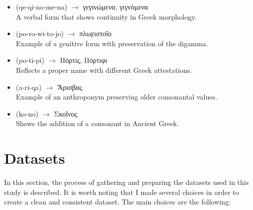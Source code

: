 \begin{itemize}
    \item \textlinb{\Bqe\Bqi\Bno\Bme\Bna} (qe-qi-no-me-na) $\rightarrow$ \textgreek{γεγινώμενα}, \textgreek{γιγνόμενα} \\  
    A verbal form that shows continuity in Greek morphology.

    \item \textlinb{\Bpo\Bro\Bwi\Bto\Bjo} (po-ro-wi-to-jo) $\rightarrow$ \textgreek{πλωϝιστοῖο} \\  
    Example of a genitive form with preservation of the digamma.

    \item \textlinb{\Bpo\Bti\Bpi} (po-ti-pi) $\rightarrow$ \textgreek{Πόρτις}, \textgreek{Πόρτιφι} \\  
    Reflects a proper name with different Greek attestations.

    \item \textlinb{\Ba\Bri\Bqa} (a-ri-qa) $\rightarrow$ \textgreek{Ἄρισβας} \\  
    Example of an anthroponym preserving older consonantal values.

    \item \textlinb{\Bko\Bno} (ko-no) $\rightarrow$ \textgreek{Σκοῖνος} \\  
    Shows the addition of a consonant in Ancient Greek.
\end{itemize}  

\section{Datasets} \label{sec:datasets}
In this section, the process of gathering and preparing the datasets used in this study is described.
It is worth noting that I made several choices in order to create a clean and consistent dataset.
The main choices are the following:

